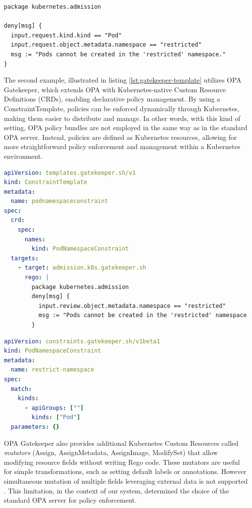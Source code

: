 \lstset{style=python}
\begin{lstlisting}[language=rego, caption={Simple OPA Rego Policy}, label={lst:opa-rego}]
package kubernetes.admission

deny[msg] {
  input.request.kind.kind == "Pod"
  input.request.object.metadata.namespace == "restricted"
  msg := "Pods cannot be created in the 'restricted' namespace."
}
\end{lstlisting}

The second example, illustrated in listing \ref{lst:gatekeeper-template} utilizes OPA Gatekeeper, which extends OPA with Kubernetes-native Custom Resource Definitions (CRDs), enabling declarative policy management. By using a ConstraintTemplate, policies can be enforced dynamically through Kubernetes, making them easier to distribute and manage.
In other words, with this kind of setting, OPA policy bundles are not employed in the same way as in the standard OPA server. Instead, policies are defined as Kubernetes resources, allowing for more straightforward policy enforcement and management within a Kubernetes environment.

\begin{lstlisting}[language=yaml, caption={OPA Gatekeeper ConstraintTemplate}, label={lst:gatekeeper-template}]
apiVersion: templates.gatekeeper.sh/v1
kind: ConstraintTemplate
metadata:
  name: podnamespaceconstraint
spec:
  crd:
    spec:
      names:
        kind: PodNamespaceConstraint
  targets:
    - target: admission.k8s.gatekeeper.sh
      rego: |
        package kubernetes.admission
        deny[msg] {
          input.review.object.metadata.namespace == "restricted"
          msg := "Pods cannot be created in the 'restricted' namespace."
        }
\end{lstlisting}

\begin{lstlisting}[language=yaml, caption={OPA Gatekeeper Constraint}, label={lst:gatekeeper-constraint}]
apiVersion: constraints.gatekeeper.sh/v1beta1
kind: PodNamespaceConstraint
metadata:
  name: restrict-namespace
spec:
  match:
    kinds:
      - apiGroups: [""]
        kinds: ["Pod"]
  parameters: {}
\end{lstlisting}

OPA Gatekeeper also provides additional Kubernetes Custom Resources called \textit{mutators} (Assign, AssignMetadata, AssignImage, ModifySet) that allow modifying resource fields without writing Rego code. These mutators are useful for simple transformations, such as setting default labels or annotations. However simultaneous mutation of multiple fields leveraging external data is not supported \cite{opa_gatekeeper_external_data}. This limitation, in the context of our system, determined the choice of the standard OPA server for policy enforcement.

